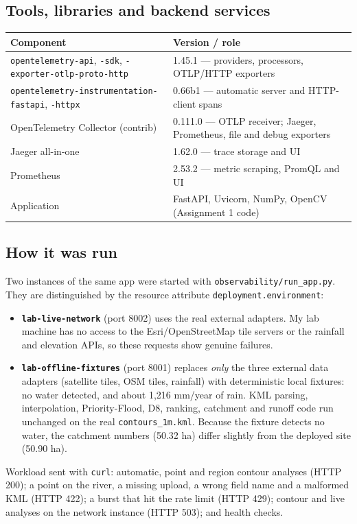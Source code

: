 \documentclass[10.5pt,a4paper]{article}
\begin{document}
\subsection{Tools, libraries and backend services}
\begin{center}\small
\begin{tabular}{@{}ll@{}}\toprule
Component & Version / role\\\midrule
\texttt{opentelemetry-api}, \texttt{-sdk}, \texttt{-exporter-otlp-proto-http} & 1.45.1 — providers, processors, OTLP/HTTP exporters\\
\texttt{opentelemetry-instrumentation-fastapi}, \texttt{-httpx} & 0.66b1 — automatic server and HTTP-client spans\\
OpenTelemetry Collector (contrib) & 0.111.0 — OTLP receiver; Jaeger, Prometheus, file and debug exporters\\
Jaeger all-in-one & 1.62.0 — trace storage and UI\\
Prometheus & 2.53.2 — metric scraping, PromQL and UI\\
Application & FastAPI, Uvicorn, NumPy, OpenCV (Assignment 1 code)\\\bottomrule
\end{tabular}\end{center}

\subsection{How it was run}
Two instances of the same app were started with \texttt{observability/run\_app.py}. They are distinguished by the resource attribute \texttt{deployment.environment}:
\begin{itemize}
\item \textbf{\texttt{lab-live-network}} (port 8002) uses the real external adapters. My lab machine has no access to the Esri/OpenStreetMap tile servers or the rainfall and elevation APIs, so these requests show genuine failures.
\item \textbf{\texttt{lab-offline-fixtures}} (port 8001) replaces \emph{only} the three external data adapters (satellite tiles, OSM tiles, rainfall) with deterministic local fixtures: no water detected, and about 1,216 mm/year of rain. KML parsing, interpolation, Priority-Flood, D8, ranking, catchment and runoff code run unchanged on the real \texttt{contours\_1m.kml}. Because the fixture detects no water, the catchment numbers (50.32 ha) differ slightly from the deployed site (50.90 ha).
\end{itemize}
Workload sent with \texttt{curl}: automatic, point and region contour analyses (HTTP 200); a point on the river, a missing upload, a wrong field name and a malformed KML (HTTP 422); a burst that hit the rate limit (HTTP 429); contour and live analyses on the network instance (HTTP 503); and health checks.
\end{document}
